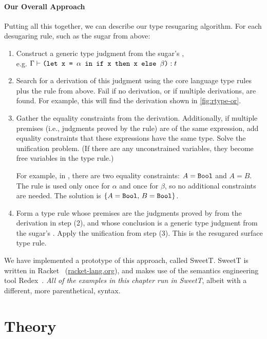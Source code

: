 \paragraph{Our Overall Approach}
Putting all this together, we can describe our type resugaring
algorithm.
For each desugaring rule, such as the  sugar from above:
\begin{enumerate}
  \item Construct a generic type judgment from the sugar's
    ,\\ %
    e.g. $\Gamma \vdash \texttt{(let x = $\alpha$ in if x then x else $\beta$)} : t$
  \item Search for a derivation of this judgment using the core
    language type rules
    plus the  rule from above. Fail if no derivation,
    or if multiple derivations, are found. For example, this will
    find the derivation shown in \cref{fig:rtype-or}.
  \item Gather the equality constraints from the derivation.
    Additionally, if multiple premises (i.e., judgments proved by the
     rule) are of the same expression, add equality
    constraints that these expressions have the same type. Solve the
    unification problem. (If there are any unconstrained variables,
    they become free variables in the type rule.)

    For example, in , there are two equality constraints:
    $A = \texttt{Bool}$ and $A = B$. The
     rule is used only once for $\alpha$ and once for
    $\beta$, so no additional constraints are needed. The solution is
    $\{A = \texttt{Bool},\,B=\texttt{Bool}\}$.
  \item Form a type rule whose premises are the judgments proved by
     from the derivation in step (2), and whose
    conclusion is a generic type judgment from the sugar's .
    Apply the unification from step (3). This is the resugared surface %
    type rule.
\end{enumerate}

We have implemented a prototype of this approach, called SweetT.
SweetT is written in Racket~\cite{plt-tr1} (\url{racket-lang.org}),
and makes use of the semantics engineering tool Redex~\cite{redex}.
\emph{All of the examples in this chapter run in SweetT},
albeit with a different, more parenthetical, syntax.


\section{Theory}

